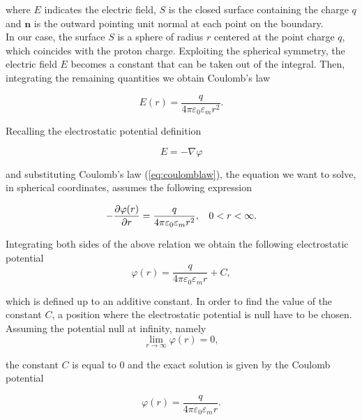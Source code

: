 \documentclass[11pt,a4paper]{article}
\begin{document}
where $E$ indicates the electric field, $S$ is the closed surface containing the charge $q$ and $\mathbf{n}$ is the outward pointing unit normal at each point on the boundary. \\
In our case, the surface $S$ is a sphere of radius $r$ centered at the point charge $q$, which coincides with the proton charge. Exploiting the spherical symmetry, the electric field $E$ becomes a constant that can be taken out of the integral. Then, integrating the remaining quantities we obtain Coulomb's law

\begin{equation}
    E(r) = \frac{q}{4 \pi \varepsilon_0 \varepsilon_m r^2}.
    \label{eq:coulomblaw}
\end{equation}

Recalling the electrostatic potential definition 

\begin{equation*}
    E = - \nabla \varphi
    \label{eq:E_PHI}
\end{equation*}

and substituting Coulomb's law (\ref{eq:coulomblaw}), the equation we want to solve, in spherical coordinates, assumes the following expression

\begin{equation}
    - \frac{\partial \varphi(r)}{\partial r} = \frac{q}{4 \pi \varepsilon_0 \varepsilon_m r^2},  \mbox{\; \;} 0 < r < \infty.
    \label{eq:exact_eq}
\end{equation}

Integrating both sides of the above relation we obtain the following electrostatic potential 
\begin{equation}
    {\varphi}(r) = \frac{{q}}{4 \pi {\varepsilon}_0 \varepsilon_m r} + C,
    \label{eq:phi_exact}
\end{equation}

which is defined up to an additive constant. In order to find the value of the constant $C$, a position where the electrostatic potential is null have to be chosen. Assuming the potential null at infinity, namely
\begin{equation}
    \lim_{r \to \infty} {\varphi}(r) = 0,
\end{equation}

the constant $C$ is equal to 0 and the exact solution is given by the Coulomb potential

\begin{equation}
    {\varphi}(r) = \frac{{q}}{4 \pi {\varepsilon}_0 \varepsilon_m r}.
    \label{eq:test1_exact}
\end{equation}
\end{document}
